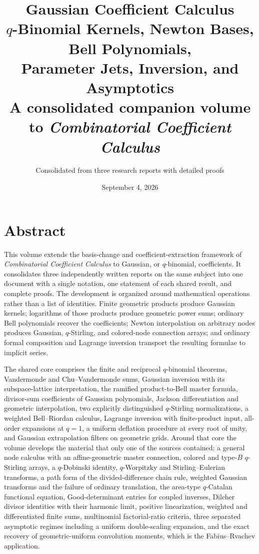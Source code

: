 \documentclass[11pt,a4paper,oneside,openany]{book}
\title{\Huge\bfseries Gaussian Coefficient Calculus\\[4mm]
 \Large \(q\)-Binomial Kernels, Newton Bases, Bell Polynomials,\\
 Parameter Jets, Inversion, and Asymptotics\\[7mm]
 \large A consolidated companion volume to \emph{Combinatorial Coefficient Calculus}}
\author{Consolidated from three research reports with detailed proofs}
\date{September 4, 2026}
\theoremstyle{definition}
\theoremstyle{remark}
\begin{document}
\frontmatter
\hypersetup{pageanchor=false}
\maketitle
\hypersetup{pageanchor=true}
\chapter*{Abstract}
This volume extends the basis-change and coefficient-extraction framework of
\emph{Combinatorial Coefficient Calculus} to Gaussian, or \(q\)-binomial,
coefficients. It consolidates three independently written reports on the
same subject into one document with a single notation, one statement of each
shared result, and complete proofs. The development is organized around
mathematical operations rather than a list of identities. Finite geometric
products produce Gaussian kernels; logarithms of those products produce
geometric power sums; ordinary Bell polynomials recover the coefficients;
Newton interpolation on arbitrary nodes produces Gaussian, \(q\)-Stirling, and
colored-node connection arrays; and ordinary formal composition and Lagrange
inversion transport the resulting formulae to implicit series.

The shared core comprises the finite and reciprocal \(q\)-binomial theorems,
Vandermonde and Chu--Vandermonde sums, Gaussian inversion with its
subspace-lattice interpretation, the ramified product-to-Bell master formula,
divisor-sum coefficients of Gaussian polynomials, Jackson differentiation and
geometric interpolation, two explicitly distinguished \(q\)-Stirling
normalizations, a weighted Bell--Riordan calculus, Lagrange inversion with
finite-product input, all-order expansions at \(q=1\), a uniform deflation
procedure at every root of unity, and Gaussian extrapolation filters on
geometric grids. Around that core the volume develops the material that only
one of the sources contained: a general node calculus with an affine-geometric
master connection, colored and type-\(B\) \(q\)-Stirling arrays, a
\(q\)-Dobinski identity, \(q\)-Worpitzky and Stirling--Eulerian transforms, a
path form of the divided-difference chain rule, weighted Gaussian transforms
and the failure of ordinary translation, the area-type \(q\)-Catalan
functional equation, Good-determinant entries for coupled inverses, Dilcher
divisor identities with their harmonic limit, positive linearization, weighted
and differentiated finite sums, multinomial factorial-ratio criteria, three
separated asymptotic regimes including a uniform double-scaling expansion, and
the exact recovery of geometric-uniform convolution moments, which is the
Fabius--Rvachev application.
\end{document}
